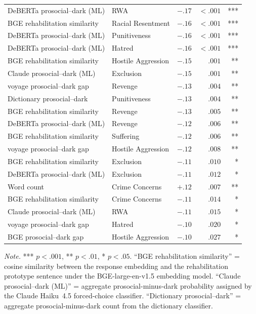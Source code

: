 \begin{table}[htbp]
\begin{tabular}{llrrr}
    DeBERTa prosocial--dark (ML)  & RWA                 & $-.17$ & $<.001$ & *** \\
    BGE rehabilitation similarity & Racial Resentment   & $-.16$ & $<.001$ & *** \\
    DeBERTa prosocial--dark (ML)  & Punitiveness        & $-.16$ & $<.001$ & *** \\
    DeBERTa prosocial--dark (ML)  & Hatred              & $-.16$ & $<.001$ & *** \\
    BGE rehabilitation similarity & Hostile Aggression  & $-.15$ & $.001$  & **  \\
    Claude prosocial--dark (ML)   & Exclusion           & $-.15$ & $.001$  & **  \\
    voyage prosocial--dark gap    & Revenge             & $-.13$ & $.004$  & **  \\
    Dictionary prosocial--dark    & Punitiveness        & $-.13$ & $.004$  & **  \\
    BGE rehabilitation similarity & Revenge             & $-.13$ & $.005$  & **  \\
    DeBERTa prosocial--dark (ML)  & Revenge             & $-.12$ & $.006$  & **  \\
    BGE rehabilitation similarity & Suffering           & $-.12$ & $.006$  & **  \\
    voyage prosocial--dark gap    & Hostile Aggression  & $-.12$ & $.008$  & **  \\
    BGE rehabilitation similarity & Exclusion           & $-.11$ & $.010$  & *   \\
    DeBERTa prosocial--dark (ML)  & Exclusion           & $-.11$ & $.012$  & *   \\
    Word count                    & Crime Concerns      & $+.12$ & $.007$  & **  \\
    BGE rehabilitation similarity & Crime Concerns      & $-.11$ & $.014$  & *   \\
    Claude prosocial--dark (ML)   & RWA                 & $-.11$ & $.015$  & *   \\
    voyage prosocial--dark gap    & Hatred              & $-.10$ & $.020$  & *   \\
    BGE prosocial--dark gap       & Hostile Aggression  & $-.10$ & $.027$  & *   \\
    \bottomrule
  \end{tabular}

  \vspace{0.5em}
  \footnotesize
  \textit{Note.} *** $p < .001$, ** $p < .01$, * $p < .05$. ``BGE rehabilitation similarity'' = cosine similarity between the response embedding and the rehabilitation prototype sentence under the BGE-large-en-v1.5 embedding model. ``Claude prosocial--dark (ML)'' = aggregate prosocial-minus-dark probability assigned by the Claude Haiku~4.5 forced-choice classifier. ``Dictionary prosocial--dark'' = aggregate prosocial-minus-dark count from the dictionary classifier.
\end{table}
